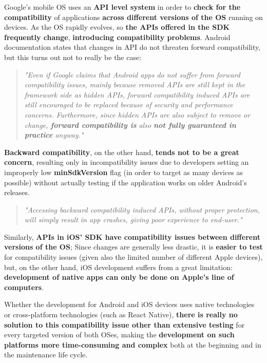 Google's mobile OS uses an \textbf{API level system} in order to \textbf{check for the compatibility} of applications \textbf{across different versions of the OS} running on devices.
As the OS rapidly evolves, so \textbf{the APIs offered in the SDK frequently change}, \textbf{introducing compatibility problems}. Android documentation states that changes in API do not threaten forward compatibility, but this turns out not to really be the case:

\begin{quotation}
    \textit{"Even if Google claims that Android apps do not suffer from forward compatibility issues, mainly because removed APIs are still kept in the framework side as hidden APIs, forward compatibility induced APIs are still encouraged to be replaced because of security and performance concerns. Furthermore, since hidden APIs are also subject to remove or change, \textbf{forward compatibility is} also \textbf{not fully guaranteed in practice} anyway." \cite{automating_android_api_compatibility_issues}}
\end{quotation}

\textbf{Backward compatibility}, on the other hand, \textbf{tends not to be a great concern}, resulting only in incompatibility issues due to developers setting an improperly low \textbf{minSdkVersion} flag (in order to target as many devices as possible) without actually testing if the application works on older Android's releases.

\begin{quotation}
    \textit{"Accessing backward compatibility induced APIs, without proper protection, will simply result in app crashes, giving poor experience to end-user." \cite{automating_android_api_compatibility_issues}}
\end{quotation}

Similarly, \textbf{APIs in iOS' SDK have compatibility issues between different versions of the OS}; Since changes are generally less drastic, it is \textbf{easier to test} for compatibility issues (given also the limited number of different Apple devices), but, on the other hand, iOS development suffers from a great limitation: \textbf{development of native apps can only be done on Apple's line of computers}.

Whether the development for Android and iOS devices uses native technologies or cross-platform technologies (such as React Native), \textbf{there is really no solution to this compatibility issue other than extensive testing} for every targeted version of both OSes, making the \textbf{development on such platforms more time-consuming and complex} both at the beginning and in the maintenance life cycle.
